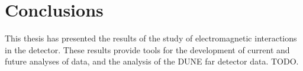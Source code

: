 \chapter{\label{ch:conclusions}Conclusions} 


\minitoc

This thesis has presented the results of the study of electromagnetic
interactions in the \protodune{} detector. These results provide tools for the
development of current and future analyses of \protodune{} data, and the
analysis of the DUNE far detector data. TODO.
